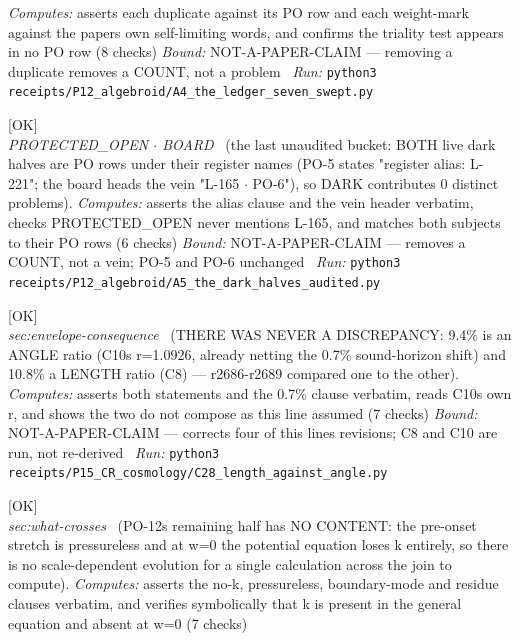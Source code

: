 \begin{description}
\emph{Computes:} asserts each duplicate against its PO row and each weight-mark against the papers own self-limiting words, and confirms the triality test appears in no PO row (8 checks)
 \emph{Bound:} NOT-A-PAPER-CLAIM --- removing a duplicate removes a COUNT, not a problem
\ \emph{Run:} \texttt{python3 receipts/P12\_algebroid/A4\_the\_ledger\_seven\_swept.py}
\item[\label{rcpt:A5_the_dark_halves_audited}\texttt{A5\_the\_dark\_halves\_audited}]\hfill\textsf{[OK]}\\
\textit{PROTECTED\_OPEN \ensuremath{\cdot} BOARD} \ (the last unaudited bucket: BOTH live dark halves are PO rows under their register names (PO-5 states "register alias: L-221"; the board heads the vein "L-165 \ensuremath{\cdot} PO-6"), so DARK contributes 0 distinct problems). 
\emph{Computes:} asserts the alias clause and the vein header verbatim, checks PROTECTED\_OPEN never mentions L-165, and matches both subjects to their PO rows (6 checks)
 \emph{Bound:} NOT-A-PAPER-CLAIM --- removes a COUNT, not a vein; PO-5 and PO-6 unchanged
\ \emph{Run:} \texttt{python3 receipts/P12\_algebroid/A5\_the\_dark\_halves\_audited.py}
\item[\label{rcpt:C28_length_against_angle}\texttt{C28\_length\_against\_angle}]\hfill\textsf{[OK]}\\
\textit{sec:envelope-consequence} \ (THERE WAS NEVER A DISCREPANCY: 9.4\% is an ANGLE ratio (C10s r=1.0926, already netting the 0.7\% sound-horizon shift) and 10.8\% a LENGTH ratio (C8) --- r2686-r2689 compared one to the other). 
\emph{Computes:} asserts both statements and the 0.7\% clause verbatim, reads C10s own r, and shows the two do not compose as this line assumed (7 checks)
 \emph{Bound:} NOT-A-PAPER-CLAIM --- corrects four of this lines revisions; C8 and C10 are run, not re-derived
\ \emph{Run:} \texttt{python3 receipts/P15\_CR\_cosmology/C28\_length\_against\_angle.py}
\item[\label{rcpt:C29_nothing_to_calculate_across_the_join}\texttt{C29\_nothing\_to\_calculate\_across\_the\_join}]\hfill\textsf{[OK]}\\
\textit{sec:what-crosses} \ (PO-12s remaining half has NO CONTENT: the pre-onset stretch is pressureless and at w=0 the potential equation loses k entirely, so there is no scale-dependent evolution for a single calculation across the join to compute). 
\emph{Computes:} asserts the no-k, pressureless, boundary-mode and residue clauses verbatim, and verifies symbolically that k is present in the general equation and absent at w=0 (7 checks)

\end{description}
